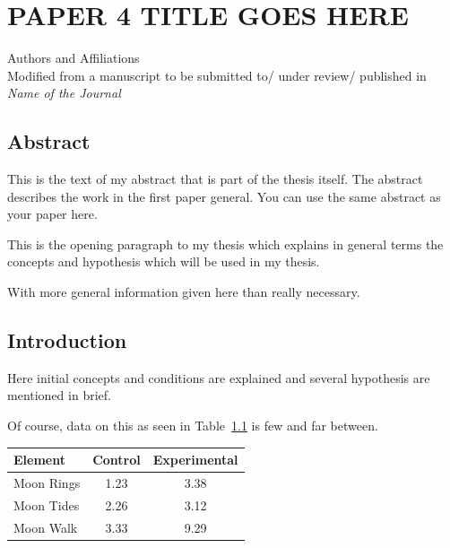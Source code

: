 \chapter{PAPER 4 TITLE GOES HERE}

\begin{center}
    Authors and Affiliations \\
    Modified from a manuscript to be submitted to/ under review/ published in \textit{Name of the Journal} 
\end{center}

\section{Abstract}
This is the text of my abstract that is part of the thesis itself.
The abstract describes the work in the first paper general. You can use the same abstract as your paper here.



This is the opening paragraph to my thesis which
explains in general terms the concepts and hypothesis
which will be used in my thesis.

With more general information given here than really
necessary.

\section{Introduction}

Here initial concepts and conditions are explained and
several hypothesis are mentioned in brief.

Of course, data on this as seen in Table~\ref{data}
is few and far between.

\begin{table}[h!tb] \centering
{}
\label{data}
\begin{tabular}{lcc} \hline
\textbf{Element} & \textbf{Control} & \textbf{Experimental} \\ \hline
Moon Rings & 1.23 & 3.38 \\
Moon Tides & 2.26 & 3.12 \\
Moon Walk & 3.33 & 9.29 \\ \hline
\end{tabular}
\end{table}


